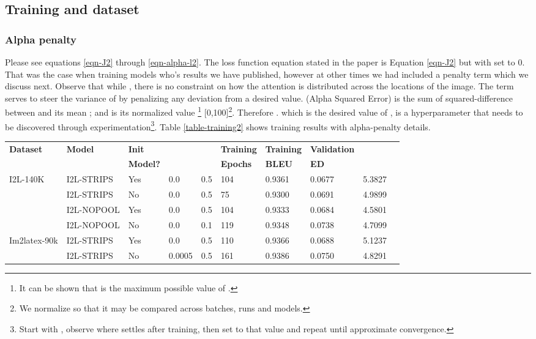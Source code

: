 \documentclass{article}
\begin{document}
\subsection{Training and dataset}
\subsubsection{Alpha penalty}
Please see equations \ref{eqn-J2} through \ref{eqn-alpha-l2}. The loss function equation stated in the paper is Equation \ref{eqn-J2} but with  set to 0. That was the case when training models who's results we have published, however at other times we had included a penalty term  which we discuss next. Observe that while {}, there is no constraint on how the attention is distributed across the  locations of the image. The term  serves to steer the variance of  by penalizing any deviation from a desired value.  (Alpha Squared Error) is the sum of squared-difference between  and its mean ; and  is its normalized value \footnote{It can be shown that   is the maximum possible value of .}  [0,100]\footnote{We normalize  so that it may be compared across batches, runs and models.}. Therefore .   which is the desired value of , is a hyperparameter that needs to be discovered through experimentation\footnote{Start with , observe where  settles after training, then set  to that value and repeat until approximate convergence.}. Table \ref{table-training2} shows training results with alpha-penalty details.
\begin{table*}[!hbtp]
	\caption{Training metrics.  for all runs.}
	\begin{tabular}{lll|lll|llll}
		\hline
		\textbf{Dataset} & \textbf{Model} & \textbf{Init}  & \textbf{}  &\textbf{}  & \textbf{Training}  & \textbf{Training}   & \textbf{Validation} & \\
		                 &                & \textbf{Model?}&                       &                    & \textbf{Epochs}    & \textbf{BLEU}       & \textbf{ED}         & \\
		\hline 
		I2L-140K    & I2L-STRIPS & Yes & 0.0    & 0.5 & 104 & 0.9361 & 0.0677 & 5.3827 \\
				    & I2L-STRIPS & No  & 0.0    & 0.5 & 75  & 0.9300 & 0.0691 & 4.9899\\
					& I2L-NOPOOL & Yes & 0.0    & 0.5 & 104 & 0.9333 & 0.0684 & 4.5801\\
					& I2L-NOPOOL & No  & 0.0    & 0.1 & 119 & 0.9348 & 0.0738 & 4.7099\\ 
		\hline
		Im2latex-90k& I2L-STRIPS & Yes & 0.0    & 0.5 & 110 & 0.9366 & 0.0688 & 5.1237\\
		& I2L-STRIPS & No  & 0.0005 & 0.5 & 161 & 0.9386 & 0.0750 & 4.8291\\
		\hline
	\end{tabular}
	\centering
	\label{table-training2}
\end{table*}
\end{document}
